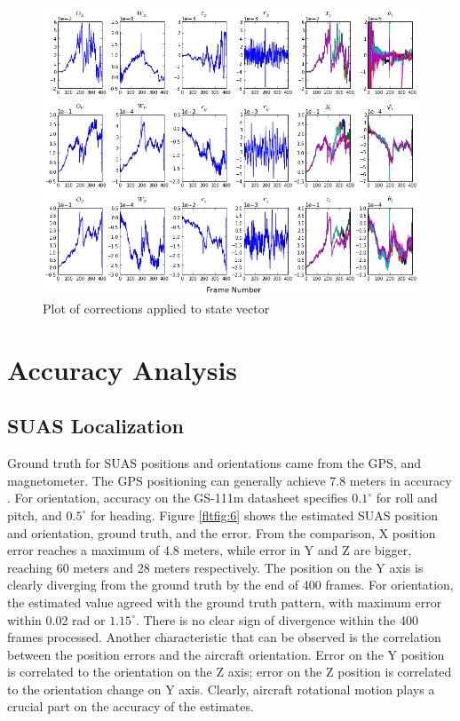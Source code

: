 \begin{figure}[h]
\centering
\includegraphics[width=15cm, keepaspectratio=true]
{./Figures/fltfig/cut1/Figure112.png}
\caption{Plot of corrections applied to state vector}
\label{fltfig:4}
\end{figure}
\FloatBarrier

\section{Accuracy Analysis}\label{sec:flight-accuracy}
\subsection{SUAS Localization}

Ground truth for SUAS positions and orientations came from the GPS,
and magnetometer. The GPS positioning can generally achieve 7.8 meters
in accuracy \cite{_gps_????}. For orientation, accuracy on the GS-111m
datasheet specifies $0.1^{\circ}$ for roll and pitch, and
$0.5^{\circ}$ for heading. Figure \ref{fltfig:6} shows the estimated
SUAS position and orientation, ground truth, and the error. From the
comparison, X position error reaches a maximum of 4.8 meters, while
error in Y and Z are bigger, reaching 60 meters and 28 meters
respectively. The position on the Y axis is clearly diverging from the
ground truth by the end of 400 frames. For orientation, the estimated
value agreed with the ground truth pattern, with maximum error within
0.02 rad or $1.15^{\circ}$. There is no clear sign of divergence
within the 400 frames processed. Another characteristic that can be
observed is the correlation between the position errors and the
aircraft orientation. Error on the Y position is correlated to the
orientation on the Z axis; error on the Z position is correlated to the
orientation change on Y axis. Clearly, aircraft rotational motion
plays a crucial part on the accuracy of the estimates.

